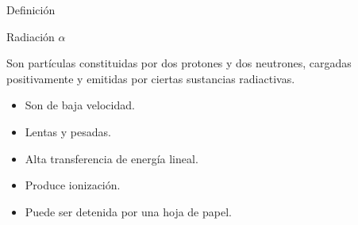 \documentclass{beamer}
\begin{document}
\begin{darkframes}
\begin{frame}{Definici\'on}
    \end{frame}
    
    
    \begin{frame}{Radiaci\'on $\alpha$} %
        Son part\'iculas constituidas por dos protones y dos neutrones, cargadas positivamente y emitidas por ciertas sustancias radiactivas.
        \begin{itemize}
            \item Son de baja velocidad.
            \item Lentas y pesadas.
            \item Alta transferencia de energ\'ia lineal.
            \item Produce ionizaci\'on.
            \item Puede ser detenida por una hoja de papel.
        \end{itemize}
    \end{frame}
    

\end{darkframes}
\end{document}
